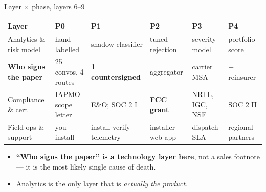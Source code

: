 \documentclass[aspectratio=169,t,10pt,xcolor={table,svgnames}]{beamer}
\newcommand{\hd}[1]{\textbf{\footnotesize #1}}
\begin{document}
\begin{frame}{Layer $\times$ phase, layers 6--9}
  \scriptsize
  \begin{tabular}{@{}p{}p{}p{}p{}p{}p{}@{}}
    \toprule
    \hd{Layer} & \hd{P0} & \hd{P1} & \hd{P2} & \hd{P3} & \hd{P4} \\
    \midrule
    Analytics \& risk model & hand-labelled & \cellcolor{fill1}shadow classifier & tuned rejection & severity model & portfolio score \\
    \textbf{Who signs the paper} & 25 convos, 4 routes & \cellcolor{fill3}\textbf{1 countersigned} & aggregator & carrier MSA & $+$reinsurer \\
    Compliance \& cert & \cellcolor{fill1}IAPMO scope letter & E\&O; SOC 2 I & \cellcolor{fill3}\textbf{FCC grant} & NRTL, IGC, NSF & SOC 2 II \\
    Field ops \& support & you install & install-verify telemetry & installer web app & dispatch SLA & regional partners \\
    \bottomrule
  \end{tabular}
  \vspace{0.7em}
  \begin{itemize}\footnotesize
    \item \textbf{``Who signs the paper'' is a technology layer here}, not a sales footnote --- it is
          the most likely single cause of death.
    \item Analytics is the only layer that is \emph{actually the product}.
  \end{itemize}
\end{frame}
\end{document}
